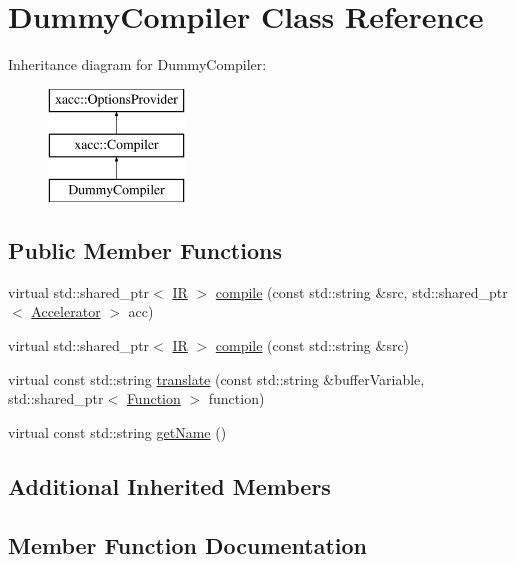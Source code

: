 \hypertarget{a01139}{}\section{Dummy\+Compiler Class Reference}
\label{a01139}
Inheritance diagram for Dummy\+Compiler\+:\begin{figure}[H]
\begin{center}
\leavevmode
\includegraphics[height=3.000000cm]{a01139}
\end{center}
\end{figure}
\subsection*{Public Member Functions}
\begin{DoxyCompactItemize}
\item 
virtual std\+::shared\+\_\+ptr$<$ \hyperlink{a01499}{IR} $>$ \hyperlink{a01139_a9eaa6e6a4ff3645915d166a325bfde8d}{compile} (const std\+::string \&src, std\+::shared\+\_\+ptr$<$ \hyperlink{a01435}{Accelerator} $>$ acc)
\item 
virtual std\+::shared\+\_\+ptr$<$ \hyperlink{a01499}{IR} $>$ \hyperlink{a01139_a2f9bb3d30bb11f12b530854a11c8fb25}{compile} (const std\+::string \&src)
\item 
virtual const std\+::string \hyperlink{a01139_a606c27150c8d374242b8824e45b1e0c1}{translate} (const std\+::string \&buffer\+Variable, std\+::shared\+\_\+ptr$<$ \hyperlink{a01475}{Function} $>$ function)
\item 
virtual const std\+::string \hyperlink{a01139_a76460cb78671dc2cf42f2bebf8fb80c7}{get\+Name} ()
\end{DoxyCompactItemize}
\subsection*{Additional Inherited Members}


\subsection{Member Function Documentation}
\mbox{\label{a01139_a9eaa6e6a4ff3645915d166a325bfde8d}} 
